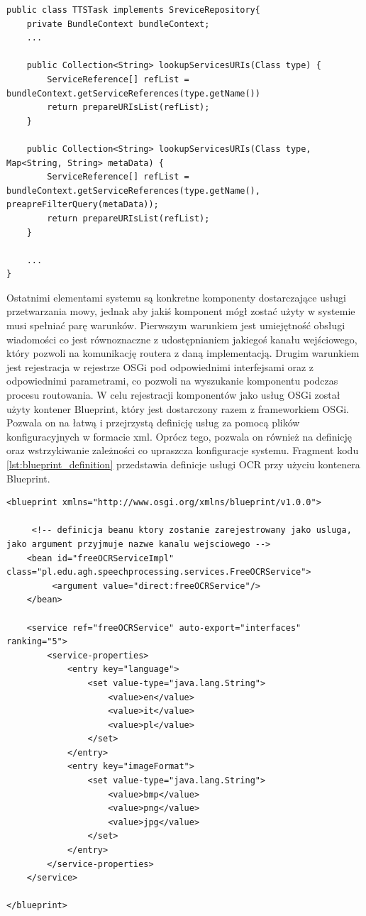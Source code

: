 \begin{center}
\begin{lstlisting}
public class TTSTask implements SreviceRepository{
	private BundleContext bundleContext;
	...
	
	public Collection<String> lookupServicesURIs(Class type) {
		ServiceReference[] refList = bundleContext.getServiceReferences(type.getName())
		return prepareURIsList(refList);
	}

	public Collection<String> lookupServicesURIs(Class type, Map<String, String> metaData) {
		ServiceReference[] refList = bundleContext.getServiceReferences(type.getName(), preapreFilterQuery(metaData));
		return prepareURIsList(refList);
	}

	...
}

\end{lstlisting}
\end{center}
Ostatnimi elementami systemu są konkretne komponenty dostarczające usługi przetwarzania mowy, jednak aby jakiś komponent mógł zostać użyty w systemie musi spełniać parę warunków. Pierwszym warunkiem jest umiejętność obsługi wiadomości co jest równoznaczne z udostępnianiem jakiegoś kanału wejściowego, który pozwoli na komunikację routera z daną implementacją. Drugim warunkiem jest rejestracja w rejestrze OSGi pod odpowiednimi interfejsami oraz z odpowiednimi parametrami, co pozwoli na wyszukanie komponentu podczas procesu routowania. W celu rejestracji komponentów jako usług OSGi został użyty kontener Blueprint, który jest dostarczony razem z frameworkiem OSGi. Pozwala on na łatwą i przejrzystą definicję usług za pomocą plików konfiguracyjnych w formacie xml. Oprócz tego, pozwala on również na definicję oraz wstrzykiwanie zależności co upraszcza konfiguracje systemu. Fragment kodu \ref{lst:blueprint_definition} przedstawia definicje usługi OCR przy użyciu kontenera Blueprint.

\lstset{language=XML, tabsize=4, caption=Definicja usługi OCR przy użyciu kontenera Blueprint.,label=lst:blueprint_definition}

\begin{center}
\begin{lstlisting}
<blueprint xmlns="http://www.osgi.org/xmlns/blueprint/v1.0.0">

	 <!-- definicja beanu ktory zostanie zarejestrowany jako usluga, jako argument przyjmuje nazwe kanalu wejsciowego -->
	<bean id="freeOCRServiceImpl" class="pl.edu.agh.speechprocessing.services.FreeOCRService">
		 <argument value="direct:freeOCRService"/> 
	</bean>

	<service ref="freeOCRService" auto-export="interfaces" ranking="5">
		<service-properties>
			<entry key="language">
				<set value-type="java.lang.String">
					<value>en</value>
					<value>it</value>
					<value>pl</value>
				</set> 
			</entry>
			<entry key="imageFormat">
				<set value-type="java.lang.String">
					<value>bmp</value>
					<value>png</value>
					<value>jpg</value>
				</set> 
			</entry>
		</service-properties>
	</service>

</blueprint>

\end{lstlisting}
\end{center}

